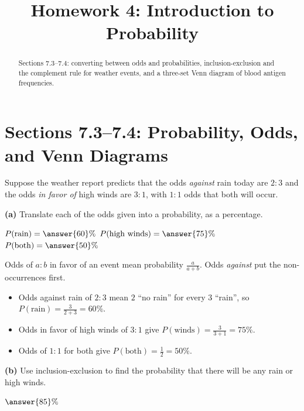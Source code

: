 \documentclass[12pt]{ximera}
\title{Homework 4: Introduction to Probability}
\begin{document}
\begin{abstract}
Sections 7.3--7.4: converting between odds and probabilities, inclusion-exclusion and
the complement rule for weather events, and a three-set Venn diagram of blood antigen
frequencies.
\end{abstract}
\maketitle

\section*{Sections 7.3--7.4: Probability, Odds, and Venn Diagrams}

\begin{problem}
Suppose the weather report predicts that the odds \emph{against} rain today are $2:3$
and the odds \emph{in favor of} high winds are $3:1$, with $1:1$ odds that both will
occur.

\begin{prompt}
\textbf{(a)} Translate each of the odds given into a probability, as a percentage.

$P(\text{rain})=\answer{60}\%$ \qquad $P(\text{high winds})=\answer{75}\%$ \qquad
$P(\text{both})=\answer{50}\%$

\begin{hint}
Odds of $a:b$ in favor of an event mean probability $\frac{a}{a+b}$. Odds \emph{against}
put the non-occurrences first.
\end{hint}

\begin{feedback}
\begin{itemize}
\item Odds against rain of $2:3$ mean $2$ ``no rain'' for every $3$ ``rain'', so
      $P(\text{rain})=\frac{3}{2+3}=60\%$.
\item Odds in favor of high winds of $3:1$ give $P(\text{winds})=\frac{3}{3+1}=75\%$.
\item Odds of $1:1$ for both give $P(\text{both})=\frac12=50\%$.
\end{itemize}
\end{feedback}
\end{prompt}

\begin{prompt}
\textbf{(b)} Use inclusion-exclusion to find the probability that there will be any rain
or high winds.

$\answer{85}\%$


\end{prompt}
\end{problem}
\end{document}

